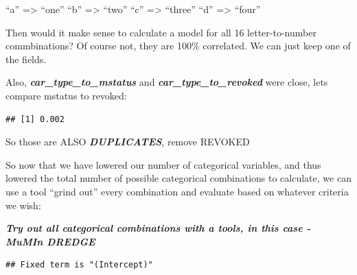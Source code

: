 \documentclass[]{article}
\newenvironment{Shaded}{\begin{snugshade}}{\end{snugshade}}
\newcommand{\KeywordTok}[1]{\textcolor[rgb]{0.13,0.29,0.53}{\textbf{{#1}}}}
\newcommand{\StringTok}[1]{\textcolor[rgb]{0.31,0.60,0.02}{{#1}}}
\newcommand{\NormalTok}[1]{{#1}}
\begin{document}
``a'' =\textgreater{} ``one'' ``b'' =\textgreater{} ``two'' ``c''
=\textgreater{} ``three'' ``d'' =\textgreater{} ``four''

Then would it make sense to calculate a model for all 16
letter-to-number commbinations? Of course not, they are 100\%
correlated. We can just keep one of the fields.

Also, \textbf{\emph{car\_type\_to\_mstatus}} and
\textbf{\emph{car\_type\_to\_revoked}} were close, lets compare mstatus
to revoked:

\begin{verbatim}
## [1] 0.002
\end{verbatim}

So those are ALSO \textbf{\emph{DUPLICATES}}, remove REVOKED

\begin{Shaded}
\end{Shaded}

So now that we have lowered our number of categorical variables, and
thus lowered the total number of possible categorical combinations to
calculate, we can use a tool ``grind out'' every combination and
evaluate based on whatever criteria we wish:

\textbf{\emph{Try out all categorical combinations with a tools, in this
case - MuMIn DREDGE}}

\begin{verbatim}
## Fixed term is "(Intercept)"
\end{verbatim}
\end{document}
